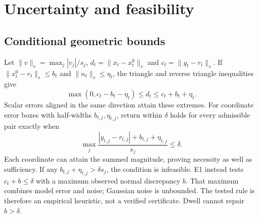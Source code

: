 \section{Uncertainty and feasibility}\label{app:uncertainty}
\subsection{Conditional geometric bounds}
Let $\|v\|_s=\max_j|v_j|/s_j$, $d_t=\|x_t-x_t^0\|_s$ and $c_t=\|y_t-r_t\|_s$. If $\|x_t^0-r_t\|_s\le b_t$ and $\|n_t\|_s\le\eta_t$, the triangle and reverse triangle inequalities give
\begin{equation}
 \max(0,c_t-b_t-\eta_t)\le d_t\le c_t+b_t+\eta_t.\label{eq:bound}
\end{equation}
Scalar errors aligned in the same direction attain these extremes. For coordinate error boxes with half-widths $b_{t,j},\eta_{t,j}$, return within $\delta$ holds for every admissible pair exactly when
\begin{equation}
 \max_j\frac{|y_{t,j}-r_{t,j}|+b_{t,j}+\eta_{t,j}}{s_j}\le\delta.\label{eq:box}
\end{equation}
Each coordinate can attain the summed magnitude, proving necessity as well as sufficiency. If any $b_{t,j}+\eta_{t,j}>\delta s_j$, the condition is infeasible. E1 instead tests $c_t+b\le\delta$ with a maximum observed normal discrepancy $b$. That maximum combines model error and noise; Gaussian noise is unbounded. The tested rule is therefore an empirical heuristic, not a verified certificate. Dwell cannot repair $b>\delta$.

